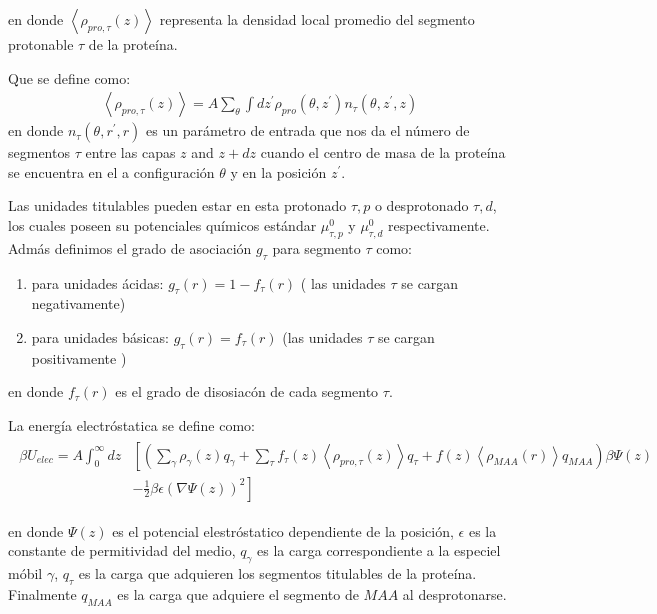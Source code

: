 \noindent en donde $\left<\rho_{pro,\tau}(z)\right>$ representa la densidad local promedio del segmento protonable $\tau$ de la prote\'ina.

Que se define como:
\begin{align}
	\left<\rho_{pro,\tau}(z)\right> = A\sum_\theta \int dz^\prime  \rho_{pro}(\theta,z^\prime)n_\tau(\theta,z^\prime, z)
	\label{eq:film:segments_pro_si}
\end{align}
\noindent en donde $n_\tau(\theta,r^\prime, r)$ es un par\'ametro de entrada que nos da el n\'umero de segmentos $\tau$ entre las capas $z$ and $z+ dz$ cuando el centro de masa de la prote\'ina se encuentra en el a configuraci\'on $\theta$ y en la posici\'on $z^\prime$.

Las unidades titulables pueden estar en esta protonado $\tau, p$ o desprotonado $\tau, d$, los cuales poseen su potenciales qu\'imicos est\'andar $\mu^0_{\tau,p}$ y $\mu^0_{\tau,d}$ respectivamente. 
Adm\'as definimos el grado de asociaci\'on $g_\tau$ para segmento $\tau$ como:


\begin{enumerate}
	\item para unidades \'acidas: $g_\tau(r) = 1-f_\tau(r)$ ( las unidades $\tau$ se cargan negativamente)
	\item para unidades b\'asicas: $g_\tau(r) = f_\tau(r)$ (las  unidades $\tau$ se cargan positivamente  )
\end{enumerate}
en donde  $f_\tau(r)$ es el grado de disosiac\'on de cada segmento $\tau$.

La energ\'ia electr\'ostatica se define como:
\begin{align}
	\begin{aligned}
		\beta U_{elec}= A\int_0^\infty dz&\left[\left(\sum_{\gamma } {\rho_\gamma(z) q_\gamma + \sum_\tau{f_\tau(z) \left<\rho_{pro,\tau}(z)\right> q_\tau} +  f(z)\left<\rho_{MAA}(r)\right>q_{MAA}}\right)\beta\Psi(z) \right. \\ &\left.-\frac{1}{2}\beta\epsilon(\nabla\Psi(z))^2 \right]
	\end{aligned}
\end{align} 

\noindent en donde $\Psi(z)$ es el potencial elestr\'ostatico dependiente de la posici\'on, $\epsilon$ es la constante de permitividad del medio, $q_\gamma$ es la carga correspondiente a la especiel m\'obil $\gamma$, $q_\tau$ es la carga que adquieren los segmentos titulables de la prote\'ina. Finalmente $q_{MAA}$ es la carga que adquiere el segmento de $MAA$ al desprotonarse.


